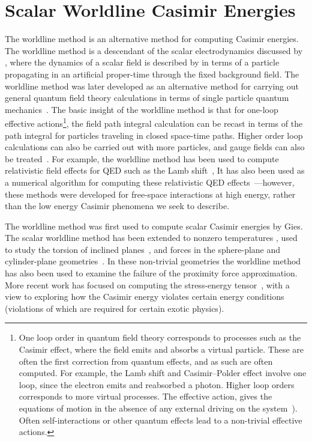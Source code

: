 \section{Scalar Worldline Casimir Energies}
\label{sec:dirichlet_worldline}
The worldline method is an alternative method for computing Casimir energies.
The worldline method is a descendant of the scalar electrodynamics 
discussed by \citet{Feynman1950}, where the dynamics of a scalar field 
is described by in terms of a particle propagating in an artificial proper-time through the fixed background field. 
The worldline method was later developed as an alternative method for 
carrying out general quantum field theory calculations in terms of single particle 
quantum mechanics~\citep{McKeon1993, Strassler1992,Schubert2001}.  
The basic insight of the worldline method is that for one-loop effective actions\footnote{
One loop order in quantum field theory corresponds to processes such as the Casimir effect,
where the field emits and absorbs a virtual particle.  These are often the first 
correction from quantum effects, and as such are often computed.  For example, the Lamb shift and Casimir--Polder 
effect involve one loop, since the electron emits and reabsorbed a photon.  Higher loop orders 
corresponds to more virtual processes.  
The effective action, gives the equations of motion
in the absence of any external driving on the system~\citep[Ch. 16]{WeinbergQFT2}).  Often self-interactions or other
quantum effects lead to a non-trivial effective actions.}, 
the field path integral calculation can be recast in terms of the path
 integral for particles traveling in closed space-time paths.
  Higher order loop calculations can also be carried out with more particles, 
and gauge fields can also be treated~\citep{Schubert2001}.
For example, the worldline method has been used to compute relativistic
field effects for QED such as the Lamb shift~\citep{Schmidt1995},  
It has also been used as a numerical algorithm for computing these relativistic 
QED effects~\citep{Mazur2014}---however, these methods were developed for free-space interactions at high energy, rather than the 
low energy Casimir phenomena we seek to describe.  

The worldline method was first used to compute scalar Casimir energies by Gies\etal\citep{Gies2003,Gies2006, Gies2006a}.
The scalar worldline method has been extended to nonzero temperatures \citep{Klingmueller2008},
 used to study the torsion of inclined planes~\citep{Weber2009},
and forces in the sphere-plane and cylinder-plane geometries~\citep{Weber2010, Weber2010a}.  
In these non-trivial geometries the worldline method has also been used to examine the failure of the proximity force approximation.
More recent work has focused on computing the stress-energy tensor~\citep{Schafer2012, Schafer2016},
with a view to exploring how the Casimir energy violates certain energy conditions (violations of which are required for certain exotic physics).

